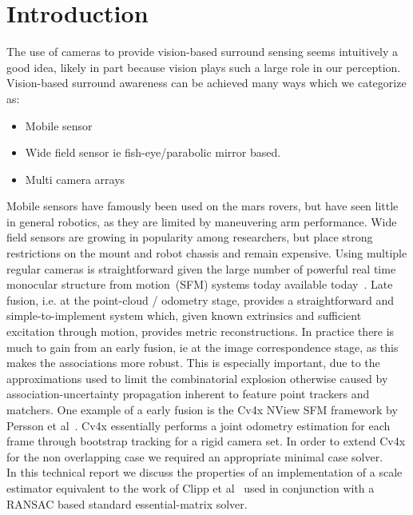 \section{Introduction}
The use of cameras to provide vision-based surround sensing seems intuitively a good idea, likely in part because vision plays such a large role in our perception. Vision-based surround awareness can be achieved many ways which we categorize as: 
\begin{itemize}
\item Mobile sensor 
\item Wide field sensor ie fish-eye/parabolic mirror based. 
\item Multi camera arrays
\end{itemize}
Mobile sensors have famously been used on the mars rovers, but have seen little in general robotics, as they are limited by maneuvering arm performance. Wide field sensors are growing in popularity among researchers, but place strong restrictions on the mount and robot chassis and remain expensive. Using multiple regular cameras is straightforward given the large number of powerful real time monocular structure from motion~(SFM) systems today available today~\cite{engel14eccv,mythesis}. Late fusion, i.e. at the point-cloud / odometry stage, provides a straightforward and simple-to-implement system which, given known extrinsics and sufficient excitation through motion, provides metric reconstructions. In practice there is much to gain from an early fusion, ie at the image correspondence stage, as this makes the associations more robust. This is especially important, due to the approximations used to limit the combinatorial explosion otherwise caused by association-uncertainty propagation inherent to feature point trackers and matchers. One example of a early fusion is the Cv4x NView SFM framework by Persson et al~\cite{persson2015robust}. Cv4x essentially performs a joint odometry estimation for each frame through bootstrap tracking for a rigid camera set. In order to extend Cv4x for the non overlapping case we required an appropriate minimal case solver. \\

In this technical report we discuss the properties of an implementation of a scale estimator equivalent to the work of Clipp et al~\cite{clipp2008robust} used in conjunction with a RANSAC based standard essential-matrix solver. 


